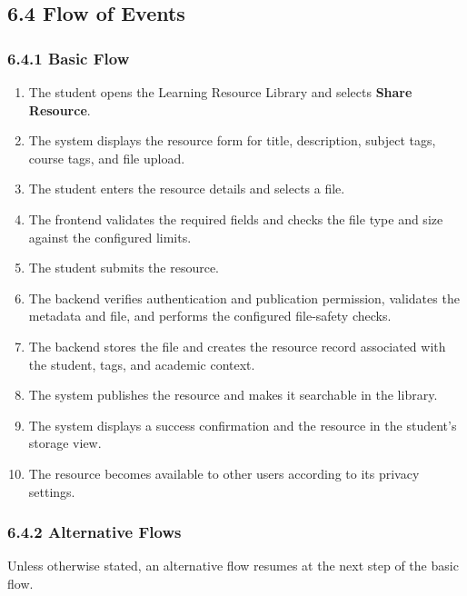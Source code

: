 \documentclass[12pt]{article}
\begin{document}
\subsection*{6.4 Flow of Events}
\par\medskip
\hypertarget{sec:6-4-1-basic-flow}{}
\subsubsection*{6.4.1 Basic Flow}
\par\medskip
\begin{enumerate}
\item The student opens the Learning Resource Library and selects \textbf{Share Resource}.
\item The system displays the resource form for title, description, subject tags, course tags, and file upload.
\item The student enters the resource details and selects a file.
\item The frontend validates the required fields and checks the file type and size against the configured limits.
\item The student submits the resource.
\item The backend verifies authentication and publication permission, validates the metadata and file, and performs the configured file-safety checks.
\item The backend stores the file and creates the resource record associated with the student, tags, and academic context.
\item The system publishes the resource and makes it searchable in the library.
\item The system displays a success confirmation and the resource in the student's storage view.
\item The resource becomes available to other users according to its privacy settings.
\end{enumerate}
\par\medskip
\hypertarget{sec:6-4-2-alternative-flows}{}
\subsubsection*{6.4.2 Alternative Flows}
\par\medskip
Unless otherwise stated, an alternative flow resumes at the next step of the basic flow.
\par\medskip
\hypertarget{sec:a1-add-or-change-tags}{}
\end{document}
